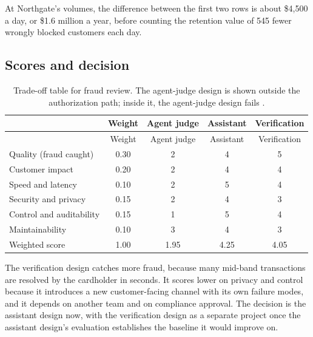 At Northgate's volumes, the difference between the first two rows is about \$4{,}500 a day, or \$1.6 million a year, before counting the retention value of 545 fewer wrongly blocked customers each day.

\subsection{Scores and decision}

\begingroup
\small
\begin{longtable}{@{}lcccc@{}}
\caption{Trade-off table for fraud review. The agent-judge design is shown outside the authorization path; inside it, the agent-judge design fails .}\label{tab:fr-tradeoff}\\
\toprule
\rowcolor{coHead} & Weight & Agent judge & Assistant & Verification \\
\midrule
\endfirsthead
\toprule
\rowcolor{coHead} & Weight & Agent judge & Assistant & Verification \\
\midrule
\endhead
Quality (fraud caught) & 0.30 & 2 & 4 & 5 \\
Customer impact & 0.20 & 2 & 4 & 4 \\
Speed and latency & 0.10 & 2 & 5 & 4 \\
Security and privacy & 0.15 & 2 & 4 & 3 \\
Control and auditability & 0.15 & 1 & 5 & 4 \\
Maintainability & 0.10 & 3 & 4 & 3 \\
\midrule
\rowcolor{coAmberBg} Weighted score & 1.00 & 1.95 & 4.25 & 4.05 \\
\bottomrule
\end{longtable}
\endgroup

The verification design catches more fraud, because many mid-band transactions are resolved by the cardholder in seconds. It scores lower on privacy and control because it introduces a new customer-facing channel with its own failure modes, and it depends on another team and on compliance approval. The decision is the assistant design now, with the verification design as a separate project once the assistant design's evaluation establishes the baseline it would improve on.
